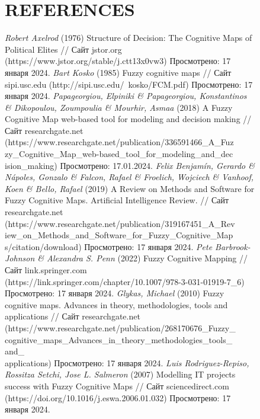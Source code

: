 \documentclass{article}
\begin{document}
\begin{figure}[!t]
\begin{minipage}{0.49\textwidth}
\begin{center}
                \chapter{REFERENCES}
            \end{center}
            \begin{thebibliography}{}
                 \textit{Robert Axelrod} (1976) Structure of Decision: The Cognitive Maps of Political Elites // Сайт jstor.org (https://www.jstor.org/stable/j.ctt13x0vw3) Просмотрено: 17 января 2024.
                 \textit{Bart Kosko} (1985) Fuzzy cognitive maps // Сайт sipi.usc.edu (http://sipi.usc.edu/~kosko/FCM.pdf) Просмотрено: 17 января 2024.
                 \textit{Papageorgiou, Elpiniki \& Papageorgiou, Konstantinos \& Dikopoulou, Zoumpoulia \& Mourhir, Asmaa} (2018) A Fuzzy Cognitive Map web-based tool for modeling and decision making // Сайт researchgate.net (https://www.researchgate.net/publication/336591466\_A\_Fuz\\
                zy\_Cognitive\_Map\_web-based\_tool\_for\_modeling\_and\_dec\\ision\_making) Просмотрено: 17.01.2024.
                 \textit{Felix Benjamín, Gerardo \& Nápoles, Gonzalo \& Falcon, Rafael \& Froelich, Wojciech \& Vanhoof, Koen \& Bello, Rafael} (2019) A Review on Methods and Software for Fuzzy Cognitive Maps. Artificial Intelligence Review. // Сайт researchgate.net (https://www.researchgate.net/publication/319167451\_A\_Rev\\iew\_on\_Methods\_and\_Software\_for\_Fuzzy\_Cognitive\_Map\\s/citation/download) Просмотрено: 17 января 2024.
                 \textit{Pete Barbrook-Johnson \& Alexandra S. Penn} (2022) Fuzzy Cognitive Mapping // Сайт link.springer.com (https://link.springer.com/chapter/10.1007/978-3-031-01919-7\_6) Просмотрено: 17 января 2024.
                 \textit{Glykas, Michael} (2010) Fuzzy cognitive maps. Advances in theory, methodologies, tools and applications // Сайт researchgate.net (https://www.researchgate.net/publication/268170676\_Fuzzy\_\\cognitive\_maps\_Advances\_in\_theory\_methodologies\_tools\_\\and\_\\applications) Просмотрено: 17 января 2024.
                 \textit{Luis Rodriguez-Repiso, Rossitza Setchi, Jose L. Salmeron} (2007) Modelling IT projects success with Fuzzy Cognitive Maps // Сайт sciencedirect.com (https://doi.org/10.1016/j.eswa.2006.01.032) Просмотрено: 17 января 2024.

\end{thebibliography}
\end{minipage}
\end{figure}
\end{document}
